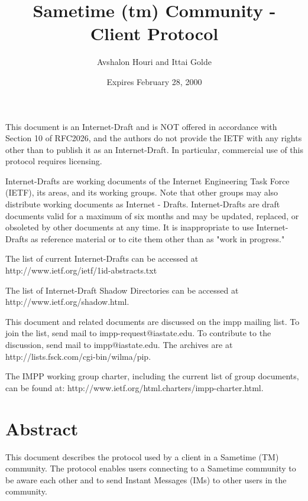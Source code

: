 \documentclass[titlepage,oneside]{book}
\title{Sametime (tm) Community - Client Protocol}
\author{Avshalon Houri and Ittai Golde}
\date{Expires February 28, 2000}
\begin{document}
\maketitle{}

\tableofcontents{}

\par{} This document is an Internet-Draft and is NOT
offered in accordance with Section 10 of RFC2026, and the authors do
not provide the IETF with any rights other than to publish it as an
Internet-Draft. In particular, commercial use of this protocol
requires licensing.

\par{} Internet-Drafts are working documents of the Internet
Engineering Task Force (IETF), its areas, and its working groups.
Note that other groups may also distribute working documents as
Internet - Drafts. Internet-Drafts are draft documents valid for a
maximum of six months and may be updated, replaced, or obsoleted by
other documents at any time. It is inappropriate to use
Internet-Drafts as reference material or to cite them other than as
"work in progress."

\par{} The list of current Internet-Drafts can be accessed at
http://www.ietf.org/ietf/1id-abstracts.txt

\par{} The list of Internet-Draft Shadow Directories can be accessed
at http://www.ietf.org/shadow.html.

\par{} This document and related documents are discussed on the impp
mailing list. To join the list, send mail to impp-request@iastate.edu.
To contribute to the discussion, send mail to impp@iastate.edu.  The
archives are at http://lists.fsck.com/cgi-bin/wilma/pip.

\par{} The IMPP working group charter, including the current list of
group documents, can be found at:
http://www.ietf.org/html.charters/impp-charter.html.

\chapter{Abstract}

\par{} This document describes the protocol used by a client in a
Sametime (TM) community. The protocol enables users connecting to a
Sametime community to be aware each other and to send Instant Messages
(IMs) to other users in the community.
\end{document}
